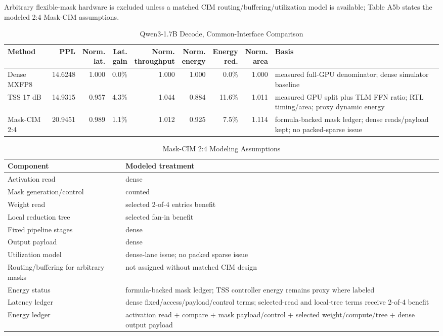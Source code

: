 \documentclass[10pt]{article}
\begin{document}
\begin{table}[!ht]
\caption{Qwen3-1.7B Decode, Common-Interface Comparison}
\footnotesize
Arbitrary flexible-mask hardware is excluded unless a matched CIM
routing/buffering/utilization model is available; Table A5b states the modeled
2:4 Mask-CIM assumptions.
\begin{tabular*}{\textwidth}{@{\extracolsep{\fill}}lrrrrrrrp{2.9in}}
\toprule
Method & PPL & \makecell[r]{Norm.\\lat.} & \makecell[r]{Lat.\\gain} &
\makecell[r]{Norm.\\throughput} & \makecell[r]{Norm.\\energy} &
\makecell[r]{Energy\\red.} & \makecell[r]{Norm.\\area} & Basis \\
\midrule
Dense MXFP8 & 14.6248 & 1.000 & 0.0\% & 1.000 & 1.000 & 0.0\% & 1.000 & measured full-GPU denominator; dense simulator baseline \\
TSS 17 dB & 14.9315 & 0.957 & 4.3\% & 1.044 & 0.884 & 11.6\% & 1.011 & measured GPU split plus TLM FFN ratio; RTL timing/area; proxy dynamic energy \\
Mask-CIM 2:4 & 20.9451 & 0.989 & 1.1\% & 1.012 & 0.925 & 7.5\% & 1.114 & formula-backed mask ledger; dense reads/payload kept; no packed-sparse issue \\
\bottomrule
\end{tabular*}
\end{table}

\clearpage

\begin{table}[!ht]
\caption{Mask-CIM 2:4 Modeling Assumptions}
\begin{tabular}{p{2.2in}p{6.5in}}
\toprule
Component & Modeled treatment \\
\midrule
Activation read & dense \\
Mask generation/control & counted \\
Weight read & selected 2-of-4 entries benefit \\
Local reduction tree & selected fan-in benefit \\
Fixed pipeline stages & dense \\
Output payload & dense \\
Utilization model & dense-lane issue; no packed sparse issue \\
Routing/buffering for arbitrary masks & not assigned without matched CIM design \\
Energy status & formula-backed mask ledger; TSS controller energy remains proxy where labeled \\
Latency ledger & dense fixed/access/payload/control terms; selected-read and local-tree terms receive 2-of-4 benefit \\
Energy ledger & activation read + compare + mask payload/control + selected weight/compute/tree + dense output payload \\
\bottomrule
\end{tabular}
\end{table}
\end{document}
